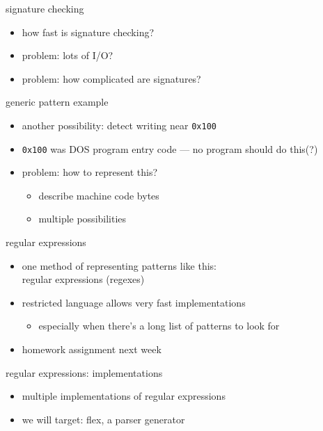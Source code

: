 \begin{frame}{signature checking}
    \begin{itemize}
    \item how fast is signature checking?
    \item problem: lots of I/O?
    \item problem: how complicated are signatures?
    \end{itemize}
\end{frame}

\begin{frame}{generic pattern example}
    \begin{itemize}
    \item another possibility: detect writing near {\tt 0x100}
    \item {\tt 0x100} was DOS program entry code  --- no program should do this(?)
    \item problem: how to represent this?
    \begin{itemize}
        \item describe machine code bytes
        \item multiple possibilities
        \end{itemize}
    \end{itemize}
\end{frame}

\begin{frame}{regular expressions}
    \begin{itemize}
    \item one method of representing patterns like this: \\
          regular expressions (regexes)
    \item restricted language allows very fast implementations
        \begin{itemize}
        \item especially when there's a long list of patterns to look for
        \end{itemize}
    \item homework assignment next week
    \end{itemize}
\end{frame}

\begin{frame}{regular expressions: implementations}
    \begin{itemize}
    \item multiple implementations of regular expressions
    \item we will target: flex, a parser generator
    \end{itemize}
\end{frame}

